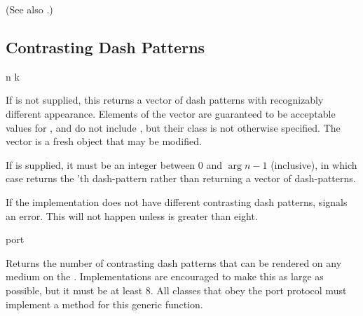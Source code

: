 (See also .)

\subsection {Contrasting Dash Patterns}

 {n \optional k}

If  is not supplied, this returns a vector of  dash patterns with
recognizably different appearance.  Elements of the vector are guaranteed to be
acceptable values for , and do not include , but their class
is not otherwise specified.  The vector is a fresh object that may be modified.

If  is supplied, it must be an integer between 0 and $\arg{n}-1$
(inclusive), in which case  returns the
'th dash-pattern rather than returning a vector of dash-patterns.

If the implementation does not have  different contrasting dash patterns,
 signals an error.  This will not happen
unless  is greater than eight.

 {port}

Returns the number of contrasting dash patterns that can be rendered on any
medium on the  .  Implementations are encouraged to make
this as large as possible, but it must be at least 8.  All classes that obey the
port protocol must implement a method for this generic function.
